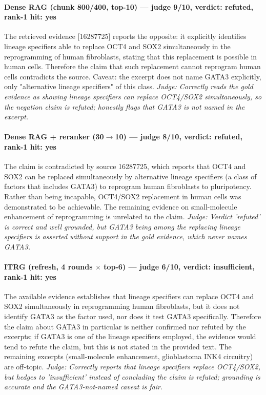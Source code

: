 \documentclass[sigconf, review, anonymous]{acmart}
\begin{document}
\paragraph{Dense RAG (chunk 800/400, top-10) --- judge 9/10, verdict: refuted, rank-1 hit: yes}
\noindent The retrieved evidence [16287725] reports the opposite: it explicitly identifies lineage specifiers able to replace OCT4 and SOX2 simultaneously in the reprogramming of human fibroblasts, stating that this replacement is possible in human cells. Therefore the claim that such replacement cannot reprogram human cells contradicts the source. Caveat: the excerpt does not name GATA3 explicitly, only "alternative lineage specifiers" of this class.
\noindent\small\textit{Judge: Correctly reads the gold evidence as showing lineage specifiers can replace OCT4/SOX2 simultaneously, so the negation claim is refuted; honestly flags that GATA3 is not named in the excerpt.}
\paragraph{Dense RAG + reranker (30$\to$10) --- judge 8/10, verdict: refuted, rank-1 hit: yes}
\noindent The claim is contradicted by source 16287725, which reports that OCT4 and SOX2 can be replaced simultaneously by alternative lineage specifiers (a class of factors that includes GATA3) to reprogram human fibroblasts to pluripotency. Rather than being incapable, OCT4/SOX2 replacement in human cells was demonstrated to be achievable. The remaining evidence on small-molecule enhancement of reprogramming is unrelated to the claim.
\noindent\small\textit{Judge: Verdict 'refuted' is correct and well grounded, but GATA3 being among the replacing lineage specifiers is asserted without support in the gold evidence, which never names GATA3.}
\paragraph{ITRG (refresh, 4 rounds $\times$ top-6) --- judge 6/10, verdict: insufficient, rank-1 hit: yes}
\noindent The available evidence establishes that lineage specifiers can replace OCT4 and SOX2 simultaneously in reprogramming human fibroblasts, but it does not identify GATA3 as the factor used, nor does it test GATA3 specifically. Therefore the claim about GATA3 in particular is neither confirmed nor refuted by the excerpts; if GATA3 is one of the lineage specifiers employed, the evidence would tend to refute the claim, but this is not stated in the provided text. The remaining excerpts (small-molecule enhancement, glioblastoma INK4 circuitry) are off-topic.
\noindent\small\textit{Judge: Correctly reports that lineage specifiers replace OCT4/SOX2, but hedges to 'insufficient' instead of concluding the claim is refuted; grounding is accurate and the GATA3-not-named caveat is fair.}
\end{document}
